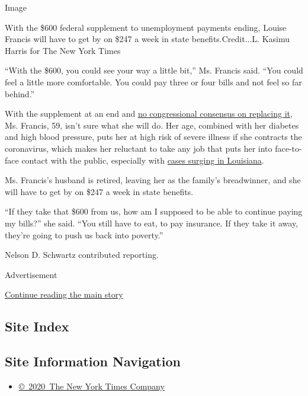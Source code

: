 Image

With the \$600 federal supplement to unemployment payments ending,
Louise Francis will have to get by on \$247 a week in state
benefits.Credit...L. Kasimu Harris for The New York Times

``With the \$600, you could see your way a little bit,'' Ms. Francis
said. ``You could feel a little more comfortable. You could pay three or
four bills and not feel so far behind.''

With the supplement at an end and
\href{https://www.nytimes3xbfgragh.onion/2020/07/29/business/economy/unemployment-benefits-coronavirus.html}{no
congressional consensus on replacing it}, Ms. Francis, 59, isn't sure
what she will do. Her age, combined with her diabetes and high blood
pressure, puts her at high risk of severe illness if she contracts the
coronavirus, which makes her reluctant to take any job that puts her
into face-to-face contact with the public, especially with
\href{https://www.nytimes3xbfgragh.onion/interactive/2020/us/louisiana-coronavirus-cases.html}{cases
surging in Louisiana}.

Ms. Francis's husband is retired, leaving her as the family's
breadwinner, and she will have to get by on \$247 a week in state
benefits.

``If they take that \$600 from us, how am I supposed to be able to
continue paying my bills?'' she said. ``You still have to eat, to pay
insurance. If they take it away, they're going to push us back into
poverty.''

Nelson D. Schwartz contributed reporting.

Advertisement

\protect\hyperlink{after-bottom}{Continue reading the main story}

\hypertarget{site-index}{%
\subsection{Site Index}\label{site-index}}

\hypertarget{site-information-navigation}{%
\subsection{Site Information
Navigation}\label{site-information-navigation}}

\begin{itemize}
\tightlist
\item
  \href{https://help.nytimes3xbfgragh.onion/hc/en-us/articles/115014792127-Copyright-notice}{©~2020~The
  New York Times Company}
\end{itemize}

